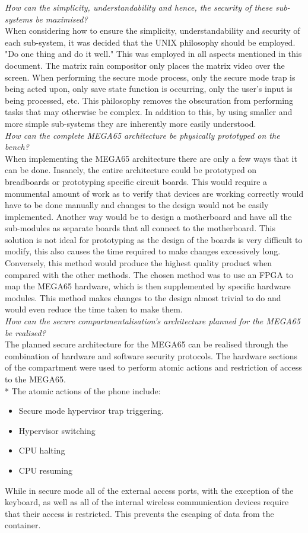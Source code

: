 \textit{How can the simplicity, understandability and hence, the security of these sub-systems be maximised?}\\
When considering how to ensure the simplicity, understandability and security of each sub-system, it was decided that the UNIX philosophy should be employed. "Do one thing and do it well." This was employed in all aspects mentioned in this document. The matrix rain compositor only places the matrix video over the screen. When performing the secure mode process, only the secure mode trap is being acted upon, only save state function is occurring, only the user's input is being processed, etc. This philosophy removes the obscuration from performing tasks that may otherwise be complex. In addition to this, by using smaller and more simple sub-systems they are inherently more easily understood. 
\\
\textit{How can the complete MEGA65 architecture be physically prototyped on the bench?}\\
When implementing the MEGA65 architecture there are only a few ways that it can be done. Insanely, the entire architecture could be prototyped on breadboards or prototyping specific circuit boards. This would require a monumental amount of work as to verify that devices are working correctly would have to be done manually and changes to the design would not be easily implemented. Another way would be to design a motherboard and have all the sub-modules as separate boards that all connect to the motherboard. This solution is not ideal for prototyping as the design of the boards is very difficult to modify, this also causes the time required to make changes excessively long. Conversely, this method would produce the highest quality product when compared with the other methods. The chosen method was to use an FPGA to map the MEGA65 hardware, which is then supplemented by specific hardware modules. This method makes changes to the design almost trivial to do and would even reduce the time taken to make them.
\\
\textit{How can the secure compartmentalisation's architecture planned for the MEGA65 be realised?}\\
The planned secure architecture for the MEGA65 can be realised through the combination of hardware and software security protocols. The hardware sections of the compartment were used to perform atomic actions and restriction of access to the MEGA65.\\*
The atomic actions of the phone include:
\begin{itemize}
\item{Secure mode hypervisor trap triggering.}
\item{Hypervisor switching}
\item{CPU halting}
\item{CPU resuming}
\end{itemize}
While in secure mode all of the external access ports, with the exception of the keyboard, as well as all of the internal wireless communication devices require that their access is restricted. This prevents the escaping of data from the container.\\

